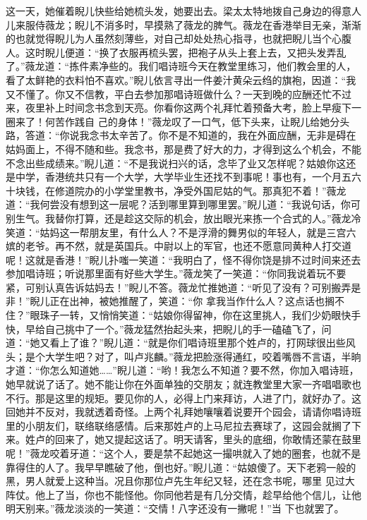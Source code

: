 \documentclass{article}
\begin{document}
这一天，她催着睨儿快些给她梳头发，她要出去。梁太太特地拨自己身边的得意人儿来服侍薇龙；睨儿不消多时，早摸熟了薇龙的脾气。薇龙在香港举目无亲，渐渐的也就觉得睨儿为人虽然刻薄些，对自己却处处热心指寻，也就把睨儿当个心腹人。这时睨儿便道：“换了衣服再梳头罢，把袍子从头上套上去，又把头发弄乱了。”薇龙道：“拣件素净些的。我们唱诗班今天在教堂里练习，他们教会里的人，看了太鲜艳的衣料怕不喜欢。”睨儿依言寻出一件姜汁黄朵云绉的旗袍，因道：“我又不懂了。你又不信教，平白去参加那唱诗班做什么？一天到晚的应酬还忙不过来，夜里补上时间念书念到天亮。你看你这两个礼拜忙着预备大考，脸上早瘦下一圈来了！何苦作践自
\newpage
己的身体！”薇龙叹了一口气，低下头来，让睨儿给她分头路，答道：“你说我念书太辛苦了。你不是不知道的，我在外面应酬，无非是碍在姑妈面上，不得不随和些。我念书，那是费了好大的力，才得到这么个机会，不能不念出些成绩来。”睨儿道：“不是我说扫兴的话，念毕了业又怎样呢？姑娘你这还是中学，香港统共只有一个大学，大学毕业生还找不到事呢！事也有，一个月五六十块钱，在修道院办的小学堂里教书，净受外国尼姑的气。那真犯不着！”薇龙道：“我何尝没有想到这一层呢？活到哪里算到哪里罢。”睨儿道：“我说句话，你可别生气。我替你打算，还是趁这交际的机会，放出眼光来拣一个合式的人。”薇龙冷笑道：“姑妈这一帮朋友里，有什么人？不是浮滑的舞男似的年轻人，就是三宫六嫔的老爷。再不然，就是英国兵。中尉以上的军官，也还不愿意同黄种人打交道呢！这就是香港！”睨儿扑嗤一笑道：“我明白了，怪不得你饶是排不过时间来还去参加唱诗班；听说那里面有好些大学生。”薇龙笑了一笑道：“你同我说着玩不要紧，可别认真告诉姑妈去！”睨儿不答。薇龙忙推她道：“听见了没有？可别搬弄是非！”睨儿正在出神，被她推醒了，笑道：“你
\newpage
拿我当作什么人？这点话也搁不住？”眼珠子一转，又悄悄笑道：“姑娘你得留神，你在这里挑人，我们少奶眼快手快，早给自己挑中了一个。”薇龙猛然抬起头来，把睨儿的手一磕磕飞了，问道：“她又看上了谁？”睨儿道：“就是你们唱诗班里那个姓卢的，打网球很出些风头；是个大学生吧？对了，叫卢兆麟。”薇龙把脸涨得通红，咬着嘴唇不言语，半晌才道：“你怎么知道她……”睨儿道：“哟！我怎么不知道？要不然，你加入唱诗班，她早就说了话了。她不能让你在外面单独的交朋友；就连教堂里大家一齐唱唱歌也不行。那是这里的规矩。要见你的人，必得上门来拜访，人进了门，就好办了。这回她并不反对，我就透着奇怪。上两个礼拜她嚷嚷着说要开个园会，请请你唱诗班里的小朋友们，联络联络感情。后来那姓卢的上马尼拉去赛球了，这园会就搁了下来。姓卢的回来了，她又提起这话了。明天请客，里头的底细，你敢情还蒙在鼓里呢！”薇龙咬着牙道：“这个人，要是禁不起她这一撮哄就入了她的圈套，也就不是靠得住的人了。我早早瞧破了他，倒也好。”睨儿道：“姑娘傻了。天下老鸦一般的黑，男人就爱上这种当。况且你那位卢先生年纪又轻，还在念书呢，哪里
\newpage
见过大阵仗。他上了当，你也不能怪他。你同他若是有几分交情，趁早给他个信儿，让他明天别来。”薇龙淡淡的一笑道：“交情！八字还没有一撇呢！”当
下也就罢了。 
\end{document}
